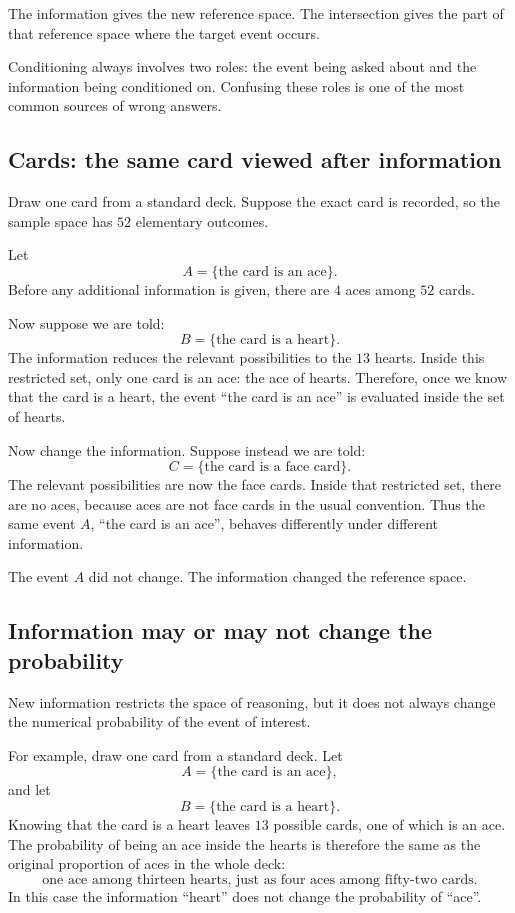 The information gives the new reference space. The intersection gives the part
of that reference space where the target event occurs.

\begin{remarkbox}
Conditioning always involves two roles: the event being asked about and the
information being conditioned on. Confusing these roles is one of the most
common sources of wrong answers.
\end{remarkbox}

\subsection*{Cards: the same card viewed after information}

Draw one card from a standard deck. Suppose the exact card is recorded, so the
sample space has \(52\) elementary outcomes.

Let
\[
A=\{\text{the card is an ace}\}.
\]
Before any additional information is given, there are \(4\) aces among \(52\)
cards.

Now suppose we are told:
\[
B=\{\text{the card is a heart}\}.
\]
The information reduces the relevant possibilities to the \(13\) hearts. Inside
this restricted set, only one card is an ace: the ace of hearts. Therefore, once
we know that the card is a heart, the event ``the card is an ace'' is evaluated
inside the set of hearts.

Now change the information. Suppose instead we are told:
\[
C=\{\text{the card is a face card}\}.
\]
The relevant possibilities are now the face cards. Inside that restricted set,
there are no aces, because aces are not face cards in the usual convention. Thus
the same event \(A\), ``the card is an ace'', behaves differently under different
information.

The event \(A\) did not change. The information changed the reference space.

\subsection*{Information may or may not change the probability}

New information restricts the space of reasoning, but it does not always change
the numerical probability of the event of interest.

For example, draw one card from a standard deck. Let
\[
A=\{\text{the card is an ace}\},
\]
and let
\[
B=\{\text{the card is a heart}\}.
\]
Knowing that the card is a heart leaves \(13\) possible cards, one of which is
an ace. The probability of being an ace inside the hearts is therefore the same
as the original proportion of aces in the whole deck:
\[
\text{one ace among thirteen hearts, just as four aces among fifty-two cards.}
\]
In this case the information ``heart'' does not change the probability of
``ace''.

